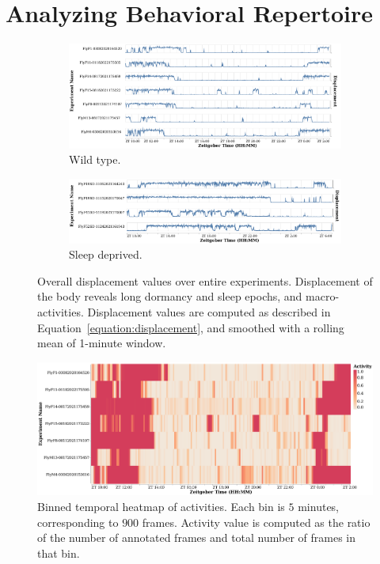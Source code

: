 \section{Analyzing Behavioral Repertoire}\label{section:analyzing-behavioral-repertoire}

\begin{figure}[ht!]
	\centering
	\begin{subfigure}[ht!]{0.95\linewidth}
		\centering\includegraphics[width=\linewidth]{figures/Velocity-WT-1T.pdf}
		\caption{Wild type.}
	\end{subfigure}%

	\begin{subfigure}[ht!]{0.95\linewidth}
		\centering\includegraphics[width=\linewidth]{figures/Velocity-SD-1T.pdf}
		\caption{Sleep deprived.}
	\end{subfigure}%
	\caption[Overall displacement values over entire experiments.]{Overall displacement values over entire experiments.
		Displacement of the body reveals long dormancy and sleep epochs, and macro-activities.
		Displacement values are computed as described in Equation~\ref{equation:displacement}, and smoothed with a rolling mean of 1-minute window.}
\end{figure}

\begin{figure}[ht!]
	\centering\includegraphics[width=\linewidth]{figures/ActivityBinned-Ann-WT-5T.pdf}
	\caption[Binned temporal heatmap of activities.]{Binned temporal heatmap of activities.
		Each bin is $5$ minutes, corresponding to $900$ frames.
		Activity value is computed as the ratio of the number of annotated frames and total number of frames in that bin.}
\end{figure}

